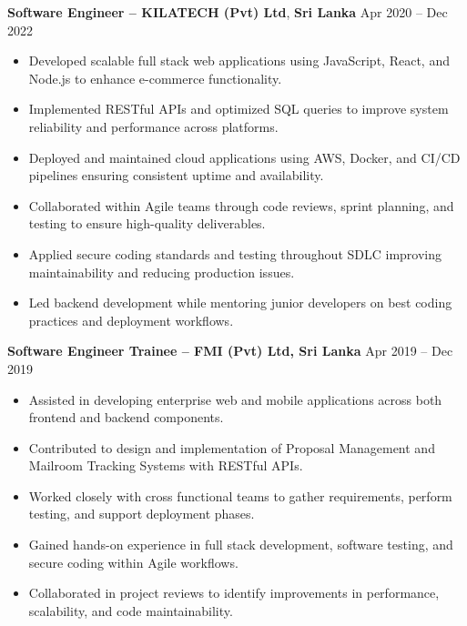 \documentclass[10pt,letterpaper]{article}
\begin{document}
\textbf{Software Engineer -- KILATECH (Pvt) Ltd}, \textbf{Sri Lanka} \hfill Apr 2020 -- Dec 2022

\vspace{-1pt}

\begin{itemize}
\item Developed scalable full stack web applications using JavaScript, React, and Node.js to enhance e-commerce functionality.
\item Implemented RESTful APIs and optimized SQL queries to improve system reliability and performance across platforms.
\item Deployed and maintained cloud applications using AWS, Docker, and CI/CD pipelines ensuring consistent uptime and availability.
\item Collaborated within Agile teams through code reviews, sprint planning, and testing to ensure high-quality deliverables.
\item Applied secure coding standards and testing throughout SDLC improving maintainability and reducing production issues.
\item Led backend development while mentoring junior developers on best coding practices and deployment workflows.
\end{itemize}

\textbf{Software Engineer Trainee -- FMI (Pvt) Ltd, Sri Lanka} \hfill Apr 2019 -- Dec 2019

\vspace{-1pt}

\begin{itemize}
\item Assisted in developing enterprise web and mobile applications across both frontend and backend components.
\item Contributed to design and implementation of Proposal Management and Mailroom Tracking Systems with RESTful APIs.
\item Worked closely with cross functional teams to gather requirements, perform testing, and support deployment phases.
\item Gained hands-on experience in full stack development, software testing, and secure coding within Agile workflows.
\item Collaborated in project reviews to identify improvements in performance, scalability, and code maintainability.
\end{itemize}

\vspace{6pt}
\end{document}
